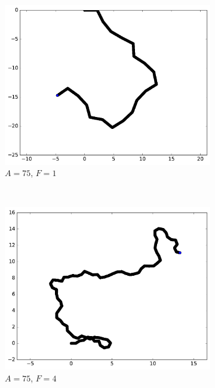 	\begin{figure}[htb]
		\begin{subfigure}[t]{\subImgWmo}
			\centering
			\includegraphics[width=\textwidth]{figures/ch3/synTraj_219_75_1}
			\caption[$A = 75$, $F=1$]{$A = 75$, $F=1$}
			\label{fig:synTraj_219_75_1}
		\end{subfigure}
		~
		\begin{subfigure}[t]{\subImgWmo}
			\centering
			\includegraphics[width=\textwidth]{figures/ch3/synTraj_219_75_4}
			\caption[$A = 75$, $F=4$]{$A = 75$, $F=4$}
			\label{fig:synTraj_219_75_4}
		\end{subfigure}
		~
		\begin{subfigure}[t]{\subImgWmo}

\end{subfigure}
\end{figure}
